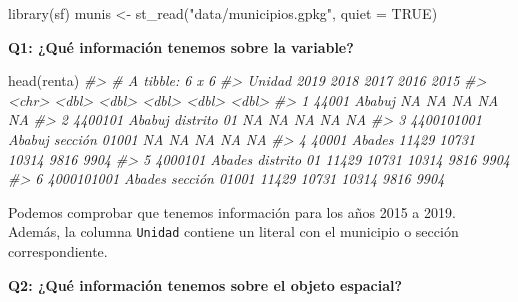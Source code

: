\documentclass[
]{book}
\newenvironment{Shaded}{\begin{snugshade}}{\end{snugshade}}
\newcommand{\AttributeTok}[1]{\textcolor[rgb]{0.77,0.63,0.00}{#1}}
\newcommand{\CommentTok}[1]{\textcolor[rgb]{0.56,0.35,0.01}{\textit{#1}}}
\newcommand{\ConstantTok}[1]{\textcolor[rgb]{0.00,0.00,0.00}{#1}}
\newcommand{\FunctionTok}[1]{\textcolor[rgb]{0.00,0.00,0.00}{#1}}
\newcommand{\NormalTok}[1]{#1}
\newcommand{\OtherTok}[1]{\textcolor[rgb]{0.56,0.35,0.01}{#1}}
\newcommand{\StringTok}[1]{\textcolor[rgb]{0.31,0.60,0.02}{#1}}
\begin{document}
\begin{Shaded}
\begin{Highlighting}[]
\FunctionTok{library}\NormalTok{(sf)}
\NormalTok{munis }\OtherTok{\textless{}{-}} \FunctionTok{st\_read}\NormalTok{(}\StringTok{"data/municipios.gpkg"}\NormalTok{, }\AttributeTok{quiet =} \ConstantTok{TRUE}\NormalTok{)}
\end{Highlighting}
\end{Shaded}

\textbf{Q1: ¿Qué información tenemos sobre la variable?}

\begin{Shaded}
\begin{Highlighting}[]
\FunctionTok{head}\NormalTok{(renta)}
\CommentTok{\#\textgreater{} \# A tibble: 6 x 6}
\CommentTok{\#\textgreater{}   Unidad                          \textasciigrave{}2019\textasciigrave{} \textasciigrave{}2018\textasciigrave{} \textasciigrave{}2017\textasciigrave{} \textasciigrave{}2016\textasciigrave{} \textasciigrave{}2015\textasciigrave{}}
\CommentTok{\#\textgreater{}   \textless{}chr\textgreater{}                            \textless{}dbl\textgreater{}  \textless{}dbl\textgreater{}  \textless{}dbl\textgreater{}  \textless{}dbl\textgreater{}  \textless{}dbl\textgreater{}}
\CommentTok{\#\textgreater{} 1 44001 Ababuj                        NA     NA     NA     NA     NA}
\CommentTok{\#\textgreater{} 2 4400101 Ababuj distrito 01          NA     NA     NA     NA     NA}
\CommentTok{\#\textgreater{} 3 4400101001 Ababuj sección 01001     NA     NA     NA     NA     NA}
\CommentTok{\#\textgreater{} 4 40001 Abades                     11429  10731  10314   9816   9904}
\CommentTok{\#\textgreater{} 5 4000101 Abades distrito 01       11429  10731  10314   9816   9904}
\CommentTok{\#\textgreater{} 6 4000101001 Abades sección 01001  11429  10731  10314   9816   9904}
\end{Highlighting}
\end{Shaded}

Podemos comprobar que tenemos información para los años 2015 a 2019. Además, la
columna \texttt{Unidad} contiene un literal con el municipio o sección correspondiente.

\textbf{Q2: ¿Qué información tenemos sobre el objeto espacial?}
\end{document}
